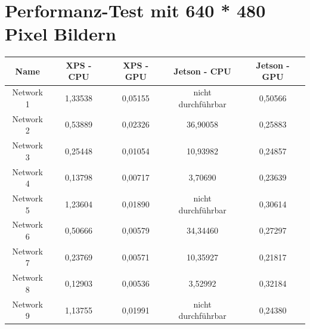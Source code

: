 \section{Performanz-Test mit 640 * 480 Pixel Bildern}
\begin{table}[H]
    \centering
    \begin{tabular}{ |c|c|c|c|c| }
        \hline
        \textbf{Name} & \textbf{XPS - CPU} & \textbf{XPS - GPU} & \textbf{Jetson - CPU} & \textbf{Jetson - GPU}   \\ \hline
        Network  1 & 1,33538                                & 0,05155                                & \textcolor{danger}{nicht durchführbar} & 0,50566                                \\ \hline
        Network  2 & 0,53889                                & 0,02326                                & 36,90058                               & 0,25883                                \\ \hline
        Network  3 & 0,25448                                & 0,01054                                & 10,93982                               & 0,24857                                \\ \hline
        Network  4 & 0,13798                                & 0,00717                                & 3,70690                                & 0,23639                                \\ \hline
        Network  5 & 1,23604                                & 0,01890                                & \textcolor{danger}{nicht durchführbar} & 0,30614                                \\ \hline
        Network  6 & 0,50666                                & 0,00579                                & 34,34460                               & 0,27297                                \\ \hline
        Network  7 & 0,23769                                & 0,00571                                & 10,35927                               & 0,21817                                \\ \hline
        Network  8 & 0,12903                                & 0,00536                                & 3,52992                                & 0,32184                                \\ \hline
        Network  9 & 1,13755                                & 0,01991                                & \textcolor{danger}{nicht durchführbar} & 0,24380                                \\ \hline

\end{tabular}
\end{table}
